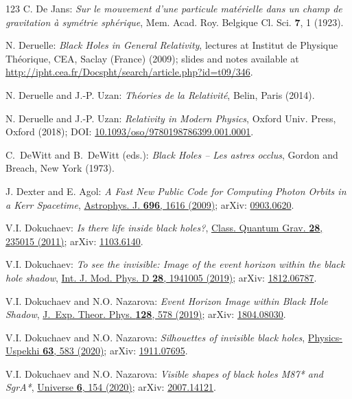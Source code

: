 \begin{thebibliography}{123}
C. De Jans:
\emph{Sur le mouvement d'une particule matérielle dans un champ de gravitation à symétrie sphérique},
Mem. Acad. Roy. Belgique Cl. Sci. {\bf 7}, 1 (1923).

N. Deruelle: {\em Black Holes in General Relativity}, lectures at
Institut de Physique Théorique, CEA, Saclay (France) (2009); slides and notes
available at
\url{http://ipht.cea.fr/Docspht/search/article.php?id=t09/346}.

N. Deruelle and J.-P. Uzan: {\em Th\'eories de la Relativit\'e},
Belin, Paris (2014).

N. Deruelle and J.-P. Uzan: {\em Relativity in Modern Physics},
Oxford Univ. Press, Oxford (2018);
DOI: \href{https://doi.org/10.1093/oso/9780198786399.001.0001}{10.1093/oso/9780198786399.001.0001}.

C.~DeWitt and B.~DeWitt (eds.):
{\em Black Holes -- Les astres occlus},
Gordon and Breach, New York (1973).

J. Dexter and E. Agol:
{\em A Fast New Public Code for Computing Photon Orbits in a Kerr Spacetime},
\href{https://doi.org/10.1088/0004-637X/696/2/1616}{Astrophys. J. {\bf 696}, 1616 (2009)};
arXiv: \href{https://arxiv.org/abs/0903.0620}{0903.0620}.

V.I. Dokuchaev: {\em Is there life inside black holes?},
\href{https://doi.org/10.1088/0264-9381/28/23/235015}{Class. Quantum Grav. {\bf 28}, 235015 (2011)};
arXiv: \href{https://arxiv.org/abs/1103.6140}{1103.6140}.

V.I. Dokuchaev: {\em To see the invisible: Image of the event horizon within the black hole shadow},
\href{https://doi.org/10.1142/S0218271819410050}{Int. J. Mod. Phys. D {\bf 28}, 1941005 (2019)};
arXiv: \href{https://arxiv.org/abs/1812.06787}{1812.06787}.

V.I. Dokuchaev and N.O. Nazarova: {\em Event Horizon Image within Black Hole Shadow},
\href{https://doi.org/10.1134/S1063776119030026}{J.~Exp. Theor. Phys. {\bf 128}, 578 (2019)};
arXiv: \href{https://arxiv.org/abs/1804.08030}{1804.08030}.

V.I. Dokuchaev and N.O. Nazarova: {\em Silhouettes of invisible black holes},
\href{https://doi.org/10.3367/UFNe.2020.01.038717}{Physics-Uspekhi {\bf 63}, 583 (2020)};
arXiv: \href{https://arxiv.org/abs/1911.07695}{1911.07695}.

V.I. Dokuchaev and N.O. Nazarova: {\em Visible shapes of black holes M87* and SgrA*},
\href{https://doi.org/10.3390/universe6090154}{Universe {\bf 6}, 154 (2020)};
arXiv: \href{https://arxiv.org/abs/2007.14121}{2007.14121}.


\end{thebibliography}
